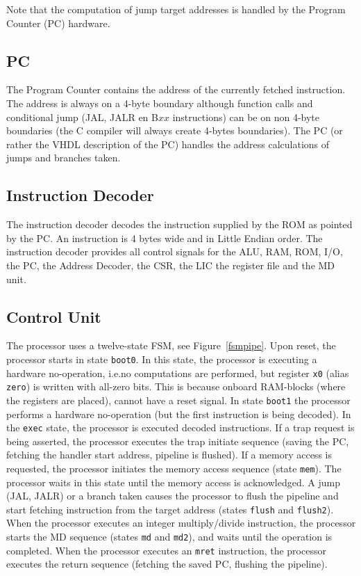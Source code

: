 \documentclass[12pt]{article}
\begin{document}
Note that the computation of jump target addresses is handled by the Program Counter (PC) hardware.

\subsection{PC}
\label{sec:pc}
The Program Counter contains the address of the currently fetched instruction. The address is always on a 4-byte boundary although function calls and conditional jump (JAL, JALR en B$xx$ instructions) can be on non 4-byte boundaries (the C compiler will always create 4-bytes boundaries). The PC (or rather the VHDL description of the PC) handles the address calculations of jumps and branches taken. %

\subsection{Instruction Decoder}
\label{sec:instructiondecoder}
The instruction decoder decodes the instruction supplied by the ROM as pointed by the PC. An instruction is 4 bytes wide and in Little Endian order. The instruction decoder provides all control signals for the ALU, RAM, ROM, I/O, the PC, the Address Decoder, the CSR, the LIC the register file and the MD unit. %

\subsection{Control Unit}
The processor uses a twelve-state FSM, see Figure~\ref{fsmpipe}. Upon reset, the processor starts in state \lstinline|boot0|. In this state, the processor is executing a hardware no-operation, i.e.\@ no computations are performed, but register \lstinline|x0| (alias \lstinline|zero|) is written with all-zero bits. This is because onboard RAM-blocks (where the registers are placed), cannot have a reset signal. In state \lstinline|boot1| the processor performs a hardware no-operation (but the first instruction is being decoded). In the \lstinline|exec| state, the processor is executed decoded instructions. If a trap request is being asserted, the processor executes the trap initiate sequence (saving the PC, fetching the handler start address, pipeline is flushed). If a memory access is requested, the processor initiates the memory access sequence (state \lstinline|mem|). The processor waits in this state until the memory access is acknowledged. A jump (JAL, JALR) or a branch taken causes the processor to flush the pipeline and start fetching instruction from the target address (states \lstinline|flush| and \lstinline|flush2|). When the processor executes an integer multiply/divide instruction, the processor starts the MD sequence (states \lstinline|md| and \lstinline|md2|), and waits until the operation is completed. When the processor executes an \lstinline|mret| instruction, the processor executes the return sequence (fetching the saved PC, flushing the pipeline).
\end{document}
